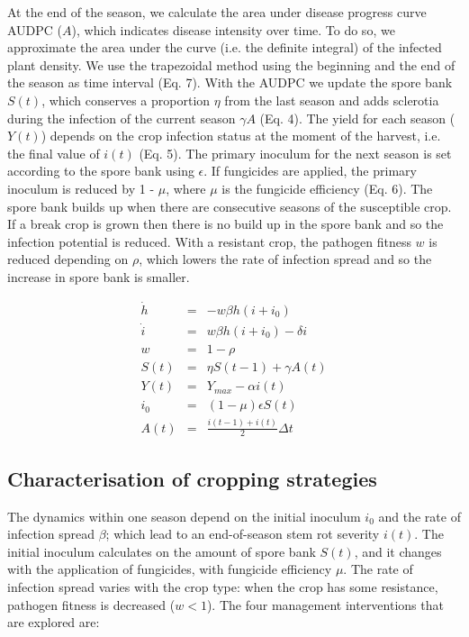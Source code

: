 \documentclass{article}
\begin{document}
At the end of the season, we calculate the area under disease progress curve AUDPC ($A$), which indicates disease intensity over time. To do so, we approximate the area under the curve (i.e. the definite integral) of the infected plant density. We use the trapezoidal method \cite{madden:2007} using the beginning and the end of the season as time interval (Eq. 7). With the AUDPC we update the spore bank $S(t)$, which conserves a proportion $\eta$ from the last season and adds sclerotia during the infection of the current season $\gamma A$ (Eq. 4). The yield for each season ($Y(t)$) depends on the crop infection status at the moment of the harvest, i.e. the final value of $i(t)$ (Eq. 5). The primary inoculum for the next season is set according to the spore bank using $\epsilon$. If fungicides are applied, the primary inoculum is reduced by 1 - $\mu$, where $\mu$ is the fungicide efficiency (Eq. 6). The spore bank builds up when there are consecutive seasons of the susceptible crop. If a break crop is grown then there is no build up in the spore bank and so the infection potential is reduced. With a resistant crop, the pathogen fitness $w$ is reduced depending on $\rho$, which lowers the rate of infection spread and so the increase in spore bank is smaller. 
%

\begin{eqnarray}
\dot{h} &=& - w \beta h (i + i_0) \\
\dot{i} &=& w \beta h (i + i_0) - \delta i \\
w & = & 1 - \rho \\
S (t) &=& \eta S(t-1) + \gamma A(t) \\
Y (t) &=& Y_{max} - \alpha i (t) \\
i_0 &=& (1 - \mu) \epsilon S(t) \\
A(t) &=& \frac{i(t-1) + i(t)}{2} \Delta t
\end{eqnarray}

\subsection{Characterisation of cropping strategies}

The dynamics within one season depend on the initial inoculum $i_0$ and the rate of infection spread $\beta$; which lead to an end-of-season stem rot severity $i(t)$. The initial inoculum calculates on the amount of spore bank $S(t)$, and it changes with the application of fungicides, with fungicide efficiency $\mu$. The rate of infection spread varies with the crop type: when the crop has some resistance, pathogen fitness is decreased ($w < 1$). 
The four management interventions that are explored are: 
\end{document}
